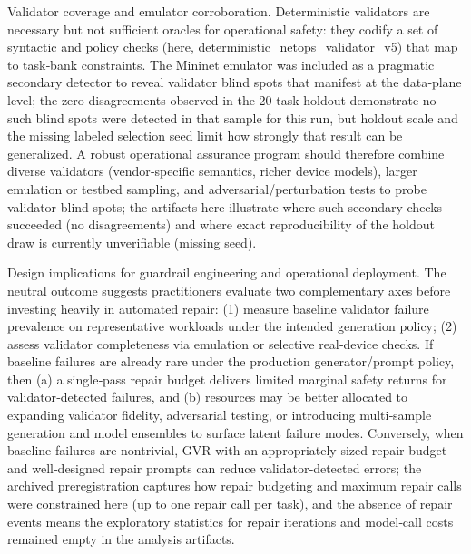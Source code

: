 \documentclass[conference]{IEEEtran}
\begin{document}
Validator coverage and emulator corroboration. Deterministic validators are necessary but not sufficient oracles for operational safety: they codify a set of syntactic and policy checks (here, deterministic\_netops\_validator\_v5) that map to task‑bank constraints. The Mininet emulator was included as a pragmatic secondary detector to reveal validator blind spots that manifest at the data‑plane level; the zero disagreements observed in the 20‑task holdout demonstrate no such blind spots were detected in that sample for this run, but holdout scale and the missing labeled selection seed limit how strongly that result can be generalized. A robust operational assurance program should therefore combine diverse validators (vendor‑specific semantics, richer device models), larger emulation or testbed sampling, and adversarial/perturbation tests to probe validator blind spots; the artifacts here illustrate where such secondary checks succeeded (no disagreements) and where exact reproducibility of the holdout draw is currently unverifiable (missing seed).

Design implications for guardrail engineering and operational deployment. The neutral outcome suggests practitioners evaluate two complementary axes before investing heavily in automated repair: (1) measure baseline validator failure prevalence on representative workloads under the intended generation policy; (2) assess validator completeness via emulation or selective real‑device checks. If baseline failures are already rare under the production generator/prompt policy, then (a) a single‑pass repair budget delivers limited marginal safety returns for validator‑detected failures, and (b) resources may be better allocated to expanding validator fidelity, adversarial testing, or introducing multi‑sample generation and model ensembles to surface latent failure modes. Conversely, when baseline failures are nontrivial, GVR with an appropriately sized repair budget and well‑designed repair prompts can reduce validator‑detected errors; the archived preregistration captures how repair budgeting and maximum repair calls were constrained here (up to one repair call per task), and the absence of repair events means the exploratory statistics for repair iterations and model‑call costs remained empty in the analysis artifacts.
\end{document}
